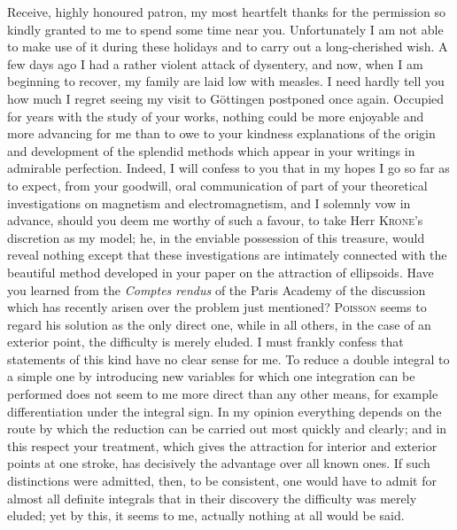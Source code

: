 \documentclass[11pt]{article}
\newcommand{\scn}[1]{\textsc{#1}}
\begin{document}
Receive, highly honoured patron, my most heartfelt thanks for the permission so kindly granted to me to spend some time near you. Unfortunately I am not able to make use of it during these holidays and to carry out a long-cherished wish. A few days ago I had a rather violent attack of dysentery, and now, when I am beginning to recover, my family are laid low with measles. I need hardly tell you how much I regret seeing my visit to Göttingen postponed once again. Occupied for years with the study of your works, nothing could be more enjoyable and more advancing for me than to owe to your kindness explanations of the origin and development of the splendid methods which appear in your writings in admirable perfection. Indeed, I will confess to you that in my hopes I go so far as to expect, from your goodwill, oral communication of part of your theoretical investigations on magnetism and electromagnetism, and I solemnly vow in advance, should you deem me worthy of such a favour, to take Herr \scn{Krone}'s discretion as my model; he, in the enviable possession of this treasure, would reveal nothing except that these investigations are intimately connected with the beautiful method developed in your paper on the attraction of ellipsoids. Have you learned from the \emph{Comptes rendus} of the Paris Academy of the discussion which has recently arisen over the problem just mentioned? \scn{Poisson} seems to regard his solution as the only direct one, while in all others, in the case of an exterior point, the difficulty is merely eluded. I must frankly confess that statements of this kind have no clear sense for me. To reduce a double integral to a simple one by introducing new variables for which one integration can be performed does not seem to me more direct than any other means, for example differentiation under the integral sign. In my opinion everything depends on the route by which the reduction can be carried out most quickly and clearly; and in this respect your treatment, which gives the attraction for interior and exterior points at one stroke, has decisively the advantage over all known ones. If such distinctions were admitted, then, to be consistent, one would have to admit for almost all definite integrals that in their discovery the difficulty was merely eluded; yet by this, it seems to me, actually nothing at all would be said.
\end{document}
